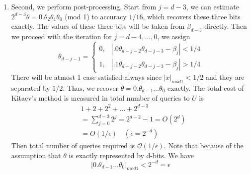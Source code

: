 \begin{enumerate}
\item Second, we perform post-processing. Start from $j=d-3$, we can estimate $2^{d-3}\theta=0.\theta_2\theta_1\theta_0$ (mod 1)
to accuracy $1/16$, which recovers these three bits exactly. The values of these three bits will be taken from $\beta_{d-3}$ directly.
Then we proceed with the iteration for $j=d-4,...,0$, we assign
\[\theta_{d-j-1}=\begin{cases} 0, & |.0\theta_{d-j-2}\theta_{d-j-3}-\beta_j|<1/4 \\
    1, &|.1\theta_{d-j-2}\theta_{d-j-3}-\beta_j|>1/4 \end{cases}
\]
There will be atmost 1 case satisfied always since $|x|_{mod1}<1/2$ and they are separated by $1/2$. Thus, we recover $\theta=0.\theta_{d-1}\ldots \theta_0$ exactly. The total cost of Kitaev's method is measured in total number of queries to $U$ is
\begin{align*}
&1+2+2^2+\ldots +2^{d-3}\\
&=\sum_{j=0}^{d-3}2^j = 2^{d-2}-1=O(2^d)\\
&=O(1/\epsilon) \quad (\epsilon=2^{-d})
\end{align*}
Then total number of queries required is $\mathcal{O}(1/\epsilon)$. Note that because of the assumption that $\theta$ is exactly represented by d-bits. We have
\[
|0.\theta_{d-1}\ldots \theta_0|_{mod 1}<2^{-d}=\epsilon
\]
\end{enumerate}

